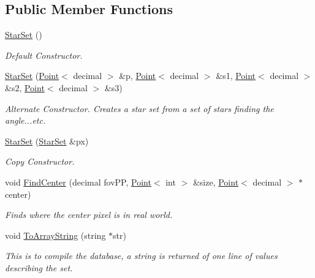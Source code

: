 \subsection*{Public Member Functions}
\begin{DoxyCompactItemize}
\item 
\mbox{\label{classstar__tracker_1_1StarSet_aad9e0a41ab7e675c242721e434f8b70a}} 
\hyperlink{classstar__tracker_1_1StarSet_aad9e0a41ab7e675c242721e434f8b70a}{Star\+Set} ()
\begin{DoxyCompactList}\small\item\em Default Constructor. \end{DoxyCompactList}\item 
\hyperlink{classstar__tracker_1_1StarSet_a08509f797475cb038d1e917c9371fa71}{Star\+Set} (\hyperlink{classutil_1_1Point}{Point}$<$ decimal $>$ \&p, \hyperlink{classutil_1_1Point}{Point}$<$ decimal $>$ \&s1, \hyperlink{classutil_1_1Point}{Point}$<$ decimal $>$ \&s2, \hyperlink{classutil_1_1Point}{Point}$<$ decimal $>$ \&s3)
\begin{DoxyCompactList}\small\item\em Alternate Constructor. Creates a star set from a set of stars finding the angle...etc. \end{DoxyCompactList}\item 
\hyperlink{classstar__tracker_1_1StarSet_a261ad8a5977ce9e81d04e6d829cdc619}{Star\+Set} (\hyperlink{classstar__tracker_1_1StarSet}{Star\+Set} \&px)
\begin{DoxyCompactList}\small\item\em Copy Constructor. \end{DoxyCompactList}\item 
void \hyperlink{classstar__tracker_1_1StarSet_ab9fef54feb19b26f942e0c6f159d74ca}{Find\+Center} (decimal fov\+PP, \hyperlink{classutil_1_1Point}{Point}$<$ int $>$ \&size, \hyperlink{classutil_1_1Point}{Point}$<$ decimal $>$ $\ast$center)
\begin{DoxyCompactList}\small\item\em Finds where the center pixel is in real world. \end{DoxyCompactList}\item 
void \hyperlink{classstar__tracker_1_1StarSet_ae48071863dce37edf7c816f0c020f0a8}{To\+Array\+String} (string $\ast$str)
\begin{DoxyCompactList}\small\item\em This is to compile the database, a string is returned of one line of values describing the set. \end{DoxyCompactList}\end{DoxyCompactItemize}
